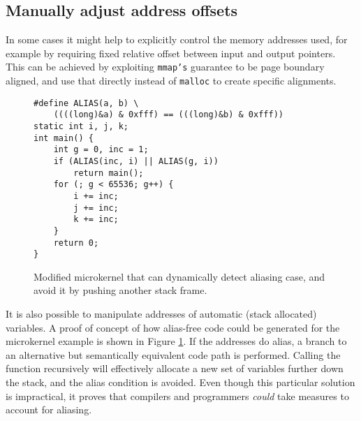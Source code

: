 \documentclass[10pt, conference, compsocconf]{IEEEtran}
\begin{document}
\subsection{Manually adjust address offsets}
In some cases it might help to explicitly control the memory addresses used, for example by requiring fixed relative offset between input and output pointers.
This can be achieved by exploiting \texttt{mmap's} guarantee to be page boundary aligned, and use that directly instead of \texttt{malloc} to create specific alignments.

\begin{figure}
  \begin{lstlisting}[frame=single, xleftmargin=.005\textwidth, xrightmargin=.005\textwidth]
#define ALIAS(a, b) \
    ((((long)&a) & 0xfff) == (((long)&b) & 0xfff))
static int i, j, k;
int main() {
    int g = 0, inc = 1;
    if (ALIAS(inc, i) || ALIAS(g, i))
        return main();
    for (; g < 65536; g++) {
        i += inc;
        j += inc;
        k += inc;
    }
    return 0;
}
  \end{lstlisting}
  \caption{Modified microkernel that can dynamically detect aliasing case, and avoid it by pushing another stack frame.}
  \label{lst:loopfixed}
\end{figure}

It is also possible to manipulate addresses of automatic (stack allocated) variables.
A proof of concept of how alias-free code could be generated for the microkernel example is shown in Figure \ref{lst:loopfixed}.
If the addresses do alias, a branch to an alternative but semantically equivalent code path is performed.
Calling the function recursively will effectively allocate a new set of variables further down the stack, and the alias condition is avoided.
Even though this particular solution is impractical, it proves that compilers and programmers \emph{could} take measures to account for aliasing.
\end{document}
